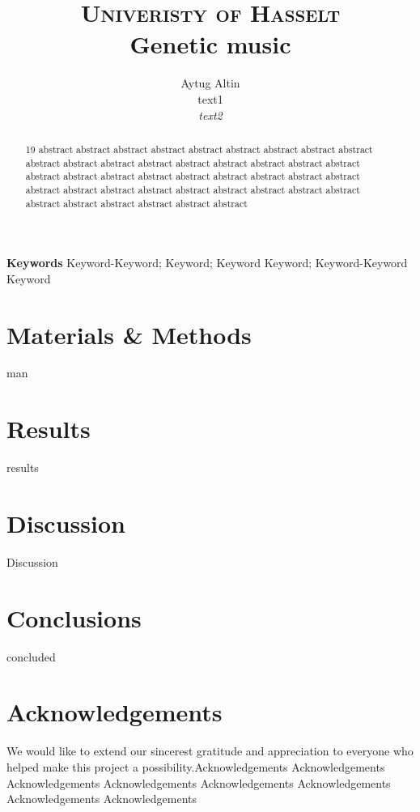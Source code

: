 \documentclass[10pt,twocolumn,letterpaper,fleqn]{article}
\title{
		\usefont{OT1}{bch}{b}{n}
		\normalfont \normalsize \textsc{Univeristy of Hasselt} \\ [10pt]
		\huge Genetic music\\
}
\author[0]{Aytug Altin \\
		text1 \\
        \textit{text2}}
\begin{document}
\maketitle
{}
\begin{abstract}
	  19 abstract abstract abstract abstract abstract abstract abstract abstract abstract abstract abstract abstract abstract abstract abstract abstract abstract abstract abstract abstract abstract abstract abstract abstract abstract abstract abstract abstract abstract abstract abstract abstract abstract abstract abstract abstract abstract abstract abstract abstract abstract abstract
\end{abstract}
{\textbf{Keywords}
Keyword-Keyword; Keyword; Keyword Keyword; Keyword-Keyword Keyword}





\section*{Materials \& Methods}
man
\section*{Results}
results

 

\section*{Discussion}
Discussion



\section*{Conclusions}
concluded


\section*{Acknowledgements}
We would like to extend our sincerest gratitude and appreciation to everyone who helped make this project a possibility.Acknowledgements Acknowledgements Acknowledgements Acknowledgements Acknowledgements Acknowledgements Acknowledgements Acknowledgements


{}
\end{document}
